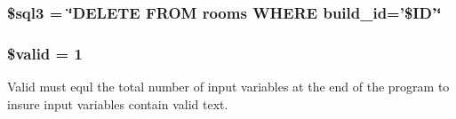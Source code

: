 \hypertarget{edBuilding_8php_af837618eb187a024f9473f6de320db84}{
\subsubsection[{\$sql3}]{\setlength{\rightskip}{0pt plus 5cm}\$sql3 = \char`\"{}\-D\-E\-L\-E\-T\-E \-F\-R\-O\-M rooms \-W\-H\-E\-R\-E build\-\_\-id='\$\-I\-D'\char`\"{}}}\label{edBuilding_8php_af837618eb187a024f9473f6de320db84}
\hypertarget{edBuilding_8php_a0587674d27d00ef497e08e53ccf45bbb}{
\subsubsection[{\$valid}]{\setlength{\rightskip}{0pt plus 5cm}\$valid = 1}}\label{edBuilding_8php_a0587674d27d00ef497e08e53ccf45bbb}
\-Valid must equl the total number of input variables at the end of the program to insure input variables contain valid text. 